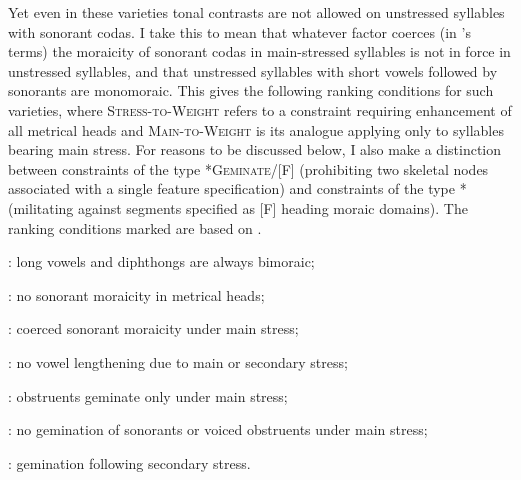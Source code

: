 Yet even in these varieties tonal contrasts are not allowed on unstressed syllables with sonorant codas. I take this to mean that whatever factor coerces (in \citeauthor{moren01:_distin}'s \citeyear{moren01:_distin} terms) the moraicity of sonorant codas in main\hyp stressed syllables is not in force in unstressed syllables, and that unstressed syllables with short vowels followed by sonorants are monomoraic. This gives the following ranking conditions for such varieties, where \textsc{Stress-to-Weight} refers to a constraint requiring enhancement of all metrical heads and \textsc{Main-to-Weight} is its analogue applying only to syllables bearing main stress. For reasons to be discussed below, I also make a distinction between constraints of the type *\textsc{Geminate}/[F] (prohibiting two skeletal nodes associated with a single feature specification) and constraints of the type *\mo[F] (militating against segments specified as [F] heading moraic domains). The ranking conditions marked \OThand{} are based on \citet{bye08}.

\begin{itemize*}
\item {}: long vowels and diphthongs are always bimoraic;
\item {}: no sonorant moraicity in metrical heads;
\item {}: coerced sonorant moraicity under main stress;
\item[\OThand] : no vowel lengthening due to main or secondary stress;
\item[\OThand] : obstruents geminate only under main stress;
\item[\OThand] : no gemination of sonorants or voiced obstruents under main stress;
\item {}: gemination following secondary stress.
\end{itemize*}

